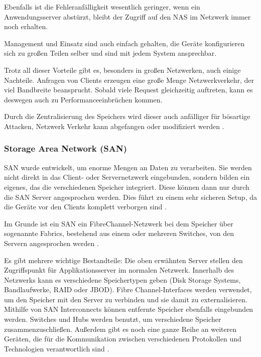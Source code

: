 Ebenfalls ist die Fehleranfälligkeit wesentlich geringer, wenn ein Anwendungsserver abstürzt, bleibt der Zugriff auf den NAS im Netzwerk immer noch erhalten.

Management und Einsatz sind auch einfach gehalten, die Geräte konfigurieren sich zu großen Teilen selber und sind mit jedem System ansprechbar.

Trotz all dieser Vorteile gibt es, besonders in großen Netzwerken, auch einige Nachteile. Anfragen von Clients erzeugen eine große Menge Netzwerkverkehr, der viel Bandbreite beansprucht. Sobald viele Request gleichzeitig auftreten, kann es deswegen auch zu Performanceeinbrüchen kommen.

Durch die Zentralisierung des Speichers wird dieser auch anfälliger für bösartige Attacken, Netzwerk Verkehr kann abgefangen oder modifiziert werden \parencite[Kap. 1, Adv. and Disadv. of NAS Devices]{gupta.2002}.


\subsubsection{Storage Area Network (SAN)}
\ac{SAN} wurde entwickelt, um enorme Mengen an Daten zu verarbeiten. Sie werden nicht direkt in das Client- oder Servernetzwerk eingebunden, sondern bilden ein eigenes, das die verschiedenen Speicher integriert. Diese können dann nur durch die SAN Server angesprochen werden. Dies führt zu einem sehr sicheren Setup, da die Geräte vor den Clients komplett verborgen sind \parencite[Kap. 1, SANs]{gupta.2002}.

Im Grunde ist ein \ac{SAN} ein FibreChannel-Netzwerk bei dem Speicher über sogenannte Fabrics, bestehend aus einem oder mehreren Switches, von den Servern angesprochen werden \parencite[S. 11]{tate.2016}.

Es gibt mehrere wichtige Bestandteile: Die oben erwähnten Server stellen den Zugriffspunkt für Applikationsserver im normalen Netzwerk. Innerhalb des Netzwerks kann es verschiedene Speichertypen geben (Disk Storage Systems, Bandlaufwerke, \acs{RAID} oder \acs{JBOD}).
Fibre Channel-Interfaces werden verwendet, um den Speicher mit den Server zu verbinden und sie damit zu externalisieren. Mithilfe von SAN Interconnects können entfernte Speicher ebenfalls eingebunden werden. Switches und Hubs werden benutzt, um verschiedene Speicher zusammenzuschließen.
Außerdem gibt es noch eine ganze Reihe an weiteren Geräten, die für die Kommunikation zwischen verschiedenen Protokollen und Technologien verantwortlich sind \parencite[Kap. 2, SAN Components and Building Blocks]{gupta.2002}.

